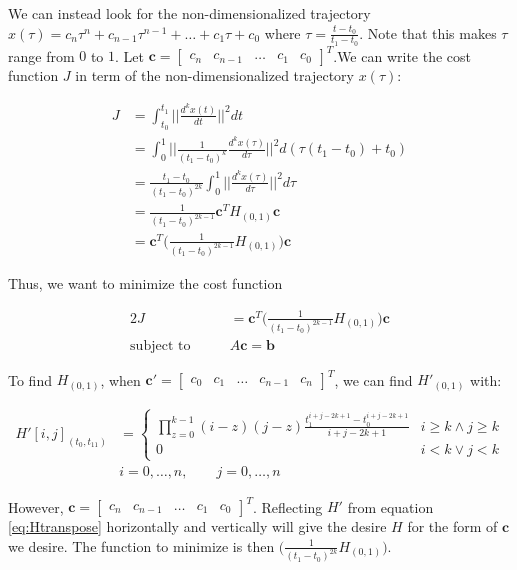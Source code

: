 \noindent We can instead look for the non-dimensionalized trajectory $x(\tau)=c_n\tau^n+c_{n-1}\tau^{n-1}+\dots+c_1\tau+c_0$ where $\tau=\frac{t-t_0}{t_1-t_0}$. Note that this makes $\tau$ range from $0$ to $1$. Let $\mathbf{c}=\begin{bmatrix}c_n & c_{n-1} & \dots & c_1 & c_0\end{bmatrix}^T$.We can write the cost function $J$ in term of the non-dimensionalized trajectory $x(\tau)$:

\begin{align}
	J &= \int_{t_0}^{t_1}\Bigg|\Bigg|\frac{d^kx(t)}{dt}\Bigg|\Bigg|^2dt \\
	&= \int_0^1\Bigg|\Bigg|\frac{1}{(t_1-t_0)^k}\frac{d^kx(\tau)}{d\tau}\Bigg|\Bigg|^2d(\tau(t_1-t_0)+t_0) \nonumber \\
	&= \frac{t_1-t_0}{(t_1-t_0)^{2k}}\int_0^1\Bigg|\Bigg|\frac{d^kx(\tau)}{d\tau}\Bigg|\Bigg|^2d\tau \nonumber \\
	&= \frac{1}{(t_1-t_0)^{2k-1}}\mathbf{c}^TH_{(0,1)}\mathbf{c} \nonumber \\
	&= \mathbf{c}^T\Bigg(\frac{1}{(t_1-t_0)^{2k-1}}H_{(0,1)}\Bigg)\mathbf{c} \nonumber
\end{align}

\noindent Thus, we want to minimize the cost function

\begin{alignat}{2}
	J &= \mathbf{c}^T\Bigg(\frac{1}{(t_1-t_0)^{2k-1}}H_{(0,1)}\Bigg)\mathbf{c} \\
	\text{subject to}\qquad & A\mathbf{c} = \mathbf{b} \nonumber
\end{alignat}

\noindent To find $H_{(0,1)}$, when $\mathbf{c}'=\begin{bmatrix}c_0 & c_1 & \dots & c_{n-1} & c_n\end{bmatrix}^T$, we can find $H'_{(0,1)}$ with:

\begin{align}
	H'[i,j]_{(t_0,t_11)} &=
	\begin{cases}
		\prod\limits_{z=0}^{k-1}(i-z)(j-z)\frac{t_1^{i+j-2k+1}-t_0^{i+j-2k+1}}{i+j-2k+1} & i\ge k \wedge j\ge k \\
		0 & i<k \vee j<k
	\end{cases} \label{eq:Htranspose} \\
	& i=0,\dots,n,\qquad j=0,\dots,n \nonumber
\end{align}

\noindent However, $\mathbf{c}=\begin{bmatrix}c_n & c_{n-1} & \dots & c_1 & c_0\end{bmatrix}^T$. Reflecting $H'$ from equation \eqref{eq:Htranspose} horizontally and vertically will give the desire $H$ for the form of $\mathbf{c}$ we desire. The function to minimize is then $\Bigg(\frac{1}{(t_1-t_0)^{2k}}H_{(0,1)}\Bigg)$.

